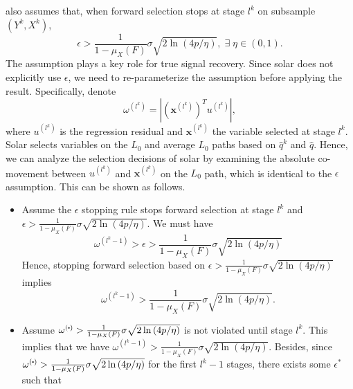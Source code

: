 \documentclass[11pt,review,authoryear]{elsarticle}
\begin{document}
\begin{appendices}
\citet{zhang09} also assumes that, when forward selection stops at stage $l^k$ on subsample $\left(Y^{k},X^{k}\right)$,
%
\begin{displaymath}
  \epsilon>\frac{1}{1-\mu_{X}\left(F\right)}\sigma\sqrt{2\ln\left(4p/\eta\right)},
  \;\exists\; \eta \in \left(0, 1\right).
\end{displaymath}
%
The assumption plays a key role for true signal recovery. Since solar does not explicitly use $\epsilon$, we need to re-parameterize the assumption before applying the \citet{zhang09} result. Specifically, denote
%
\begin{equation}
  \omega^{\left(l^k\right)} = \left\vert \left( \mathbf{x}^{\left( l^k \right)}\right) ^T u^{\left(l^k \right)} \right\vert,
\end{equation}
%
where $u^{\left( l^k \right)}$ is the regression residual and $\mathbf{x}^{ \left( l^k \right)}$ the variable selected at stage $l^k$. Solar selects variables on the $L_0$ and average $L_0$ paths based on $\widehat{q}^k$ and $\widehat{q}$. Hence, we can analyze the selection decisions of solar by examining the absolute co-movement between $u^{\left( l^k \right)}$ and $\mathbf{x}^{ \left( l^k \right)}$ on the $L_0$ path, which is identical to the $\epsilon$ assumption. This can be shown as follows.
%
\begin{itemize}
  \item Assume the $\epsilon$ stopping rule stops forward selection at stage $l^k$ and $\epsilon > \frac{1}{1-\mu_{X}\left(F\right)}\sigma\sqrt{2\ln\left(4p/\eta\right)}$. We must have
  \begin{equation}
    \omega^{\left(l^k - 1\right)} > \epsilon > \frac{1}{1 - \mu_X \left( F \right)} \sigma \sqrt{ 2 \ln \left(4p / \eta \right)}
  \end{equation}
  Hence, stopping forward selection based on $\epsilon > \frac{1}{1 - \mu_X \left( F \right)} \sigma \sqrt{ 2 \ln \left(4p / \eta \right)}$ implies
  \begin{displaymath}
    \omega^{\left(l^k - 1\right)} > \frac{1}{1 - \mu_X \left( F \right)} \sigma \sqrt{ 2 \ln \left(4p / \eta \right)}.
  \end{displaymath}
  \item Assume $\omega^{\left(\bigcdot\right)} > \frac{1}{1 - \mu_X \left( F \right)} \sigma \sqrt{ 2 \ln \left(4p / \eta \right)}$ is not violated until stage $l^k$. This implies that we have $\omega^{\left(l^k - 1 \right)} > \frac{1}{1 - \mu_X \left( F \right)} \sigma \sqrt{ 2 \ln \left(4p / \eta \right)}$. Besides, since $\omega^{\left(\bigcdot\right)} > \frac{1}{1 - \mu_X \left( F \right)} \sigma \sqrt{ 2 \ln \left(4p / \eta \right)}$ for the first $l^k-1$ stages, there exists some $\epsilon^*$ such that

\end{itemize}
\end{appendices}
\end{document}
